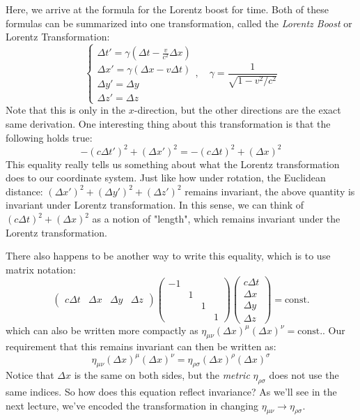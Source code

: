 Here, we arrive at the formula for the Lorentz boost for time. Both of these formulas can be summarized into
one transformation, called the \textit{Lorentz Boost} or Lorentz Transformation:
\[
	\begin{cases}
		\Delta t' = \gamma\left( \Delta t - \frac{v}{c^2}\Delta x \right)\\
		\Delta x' = \gamma(\Delta x - v \Delta t)\\
		\Delta y' = \Delta y \\
		\Delta z' = \Delta z
	\end{cases},
	\quad \gamma = \frac{1}{\sqrt{1 - v^2 / c^2}}
\]
Note that this is only in the \( x \)-direction, but the other directions are the exact same derivation. One
interesting thing about this transformation is that the following holds true:   
\[
	-(c \Delta t')^2 + (\Delta x')^2 = -(c \Delta t)^2 + (\Delta x)^2
\]
This equality really tells us something about what the Lorentz transformation does to our coordinate system.
Just like how under rotation, the Euclidean distance: \( (\Delta x')^2 + (\Delta y')^2 + (\Delta z')^2 \)
remains invariant, the above quantity is invariant under Lorentz transformation. In this sense, we can think
of \( (c \Delta t)^2 + (\Delta x)^2 \) as a notion of "length", which remains invariant under the Lorentz
transformation.
 
There also happens to be another way to write this equality, which is to use matrix notation:
\[
	\begin{pmatrix} c \Delta t & \Delta x & \Delta y & \Delta z \end{pmatrix} 
	\begin{pmatrix} -1 & & &\\ & 1 & & \\ & & 1 & \\ & & & 1\end{pmatrix}
	\begin{pmatrix} c \Delta t\\ \Delta x \\ \Delta y\\ \Delta z \end{pmatrix} = \text{const.}
\]
which can also be written more compactly as \( \eta_{\mu \nu}(\Delta x)^{\mu} (\Delta x)^{\nu} =
\text{const.} \). Our requirement that this remains invariant can then be written as:
\[
	\eta_{\mu \nu}(\Delta x)^{\mu}(\Delta x)^{\nu} = \eta_{\rho \sigma}(\Delta x)^{\rho}(\Delta x)^{\sigma}
\]
Notice that \( \Delta x \) is the same on both sides, but the \textit{metric} \( \eta_{\rho \sigma} \) does
not use the same indices. So how does this equation reflect invariance? As we'll see in the next lecture,
we've encoded the transformation in changing \( \eta_{\mu \nu} \to \eta_{\rho \sigma} \). 


